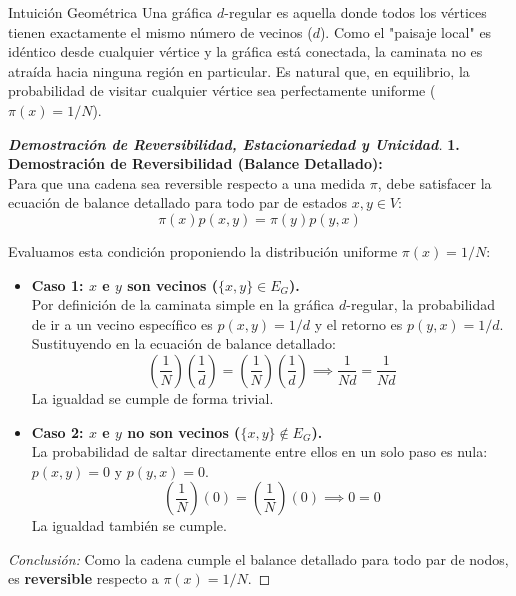 \documentclass[10pt,a4paper]{article}
\begin{document}
\vspace{2mm}

\begin{nota}{Intuición Geométrica}
    Una gráfica $d$-regular es aquella donde todos los vértices tienen exactamente el mismo número de vecinos ($d$). Como el "paisaje local" es idéntico desde cualquier vértice y la gráfica está conectada, la caminata no es atraída hacia ninguna región en particular. Es natural que, en equilibrio, la probabilidad de visitar cualquier vértice sea perfectamente uniforme ($\pi(x) = 1/N$).
\end{nota}

\vspace{5mm}

\begin{proof}[\textbf{Demostración de Reversibilidad, Estacionariedad y Unicidad}]
    \textbf{1. Demostración de Reversibilidad (Balance Detallado):} \\
    Para que una cadena sea reversible respecto a una medida $\pi$, debe satisfacer la ecuación de balance detallado para todo par de estados $x, y \in V$:
    \[ \pi(x)p(x,y) = \pi(y)p(y,x) \]
    
    Evaluamos esta condición proponiendo la distribución uniforme $\pi(x) = 1/N$:
    \begin{itemize}
        \item \textbf{Caso 1: $x$ e $y$ son vecinos ($\{x,y\} \in E_G$).} \\
        Por definición de la caminata simple en la gráfica $d$-regular, la probabilidad de ir a un vecino específico es $p(x,y) = 1/d$ y el retorno es $p(y,x) = 1/d$.
        Sustituyendo en la ecuación de balance detallado:
        \[ \left(\frac{1}{N}\right)\left(\frac{1}{d}\right) = \left(\frac{1}{N}\right)\left(\frac{1}{d}\right) \implies \frac{1}{Nd} = \frac{1}{Nd} \]
        La igualdad se cumple de forma trivial.
        
        \item \textbf{Caso 2: $x$ e $y$ no son vecinos ($\{x,y\} \notin E_G$).} \\
        La probabilidad de saltar directamente entre ellos en un solo paso es nula: $p(x,y) = 0$ y $p(y,x) = 0$.
        \[ \left(\frac{1}{N}\right)(0) = \left(\frac{1}{N}\right)(0) \implies 0 = 0 \]
        La igualdad también se cumple.
    \end{itemize}
    \textit{Conclusión:} Como la cadena cumple el balance detallado para todo par de nodos, es \textbf{reversible} respecto a $\pi(x) = 1/N$.
    

\end{proof}
\end{document}

